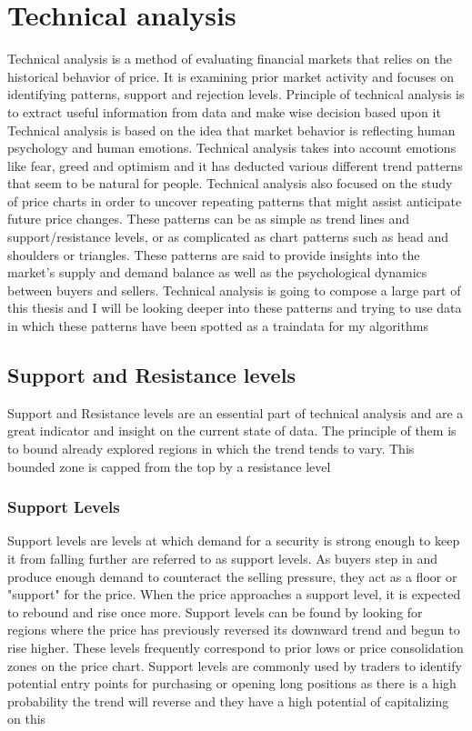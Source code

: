 \documentclass{imc-inf}
\begin{document}
	\section{Technical analysis}
	Technical analysis \cite{tech_analysis} is a method of evaluating financial markets that relies on the historical behavior of price.
	It is examining prior market activity and focuses on identifying patterns, support and rejection levels.
	Principle of technical analysis is to extract useful information from data and make wise decision based upon it
	Technical analysis is based on the idea that market behavior is reflecting human psychology and human emotions.
	Technical analysis takes into account emotions like fear, greed and optimism and it has deducted various different trend patterns that seem to be natural for people.
	Technical analysis also focused on the study of price charts in order to uncover repeating patterns that might assist anticipate future price changes.
	These patterns can be as simple as trend lines and support/resistance levels, or as complicated as chart patterns such as head and shoulders or triangles.
	These patterns are said to provide insights into the market's supply and demand balance as well as the psychological dynamics between buyers and sellers.
	Technical analysis is going to compose a large part of this thesis and I will be looking deeper into these patterns and trying to use data
	in which these patterns have been spotted as a traindata for my algorithms
		\subsection{Support and Resistance levels}
		Support and Resistance levels are an essential part of technical analysis and are a great indicator and insight on the current state of data.
		The principle of them is to bound already explored regions in which the trend tends to vary. This bounded zone is capped from the top by a resistance level
			\subsubsection{Support Levels}
				Support levels are levels at which demand for a security is strong enough to keep it from falling further are referred to as support levels.
				As buyers step in and produce enough demand to counteract the selling pressure, they act as a floor or "support" for the price.
				 When the price approaches a support level, it is expected to rebound and rise once more.
				Support levels can be found by looking for regions where the price has previously reversed its downward trend and begun to rise higher.
				These levels frequently correspond to prior lows or price consolidation zones on the price chart. 
				Support levels are commonly used by traders to identify potential entry points for purchasing or opening long positions
				 as there is a high probability the trend will reverse and they have a high potential of capitalizing on this
\end{document}

